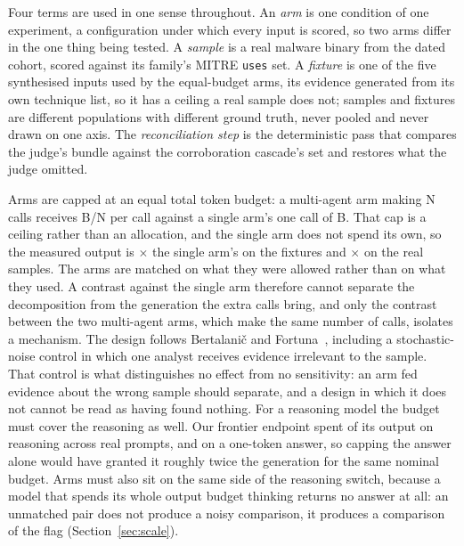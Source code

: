 Four terms are used in one sense throughout. An \emph{arm} is one condition of one experiment, a
configuration under which every input is scored, so two arms differ in the one thing being tested. A
\emph{sample} is a real malware binary from the dated cohort, scored against its family's MITRE
\texttt{uses} set. A \emph{fixture} is one of the five synthesised inputs used by the equal-budget
arms, its evidence generated from its own technique list, so it has a ceiling a real sample does
not; samples and fixtures are different populations with different ground truth, never pooled and
never drawn on one axis. The \emph{reconciliation step} is the deterministic pass that compares the
judge's bundle against the corroboration cascade's set and restores what the judge omitted.

Arms are capped at an equal total token budget: a multi-agent arm making N calls receives B/N per
call against a single arm's one call of B. That cap is a ceiling rather than an allocation, and the
single arm does not spend its own, so the measured output is $\times$
the single arm's on the fixtures and $\times$ on the real
samples. The arms are matched on what they were allowed rather than on what they used. A contrast
against the single arm therefore cannot separate the decomposition from the generation the extra
calls bring, and only the contrast between the two multi-agent arms, which make the same number of
calls, isolates a mechanism. The design
follows Bertalani\v{c} and Fortuna~\cite{bertalanic2026consensus}, including a stochastic-noise control
in which one analyst receives evidence irrelevant to the sample. That control is what distinguishes
no effect from no sensitivity: an arm fed evidence about the wrong sample should separate, and a
design in which it does not cannot be read as having found nothing. For a reasoning model the budget must cover the reasoning as well. Our frontier endpoint spent
 of its output on reasoning across  real prompts,
and  on a one-token answer, so capping the answer alone would have
granted it roughly twice the generation for the same nominal budget. Arms must also sit on the same
side of the reasoning switch, because a model that spends its whole output budget thinking returns
no answer at all: an unmatched pair does not produce a noisy comparison, it produces a comparison of
the flag (Section~\ref{sec:scale}).

